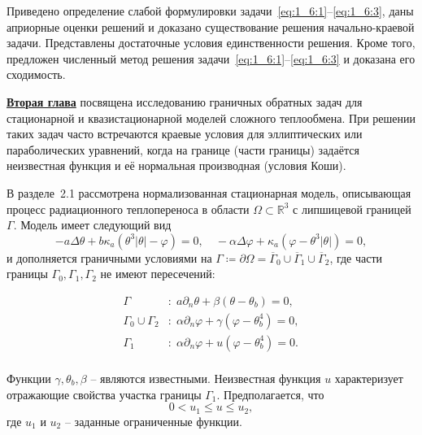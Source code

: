 Приведено определение слабой формулировки задачи~\eqref{eq:1_6:1}--\eqref{eq:1_6:3},
даны априорные оценки решений и доказано существование решения начально-краевой задачи.
Представлены достаточные условия единственности решения.
Кроме того, предложен численный метод решения задачи~\eqref{eq:1_6:1}--\eqref{eq:1_6:3}
и доказана его сходимость.


\underline{\textbf{Вторая глава}} посвящена исследованию граничных обратных задач для
стационарной и квазистационарной моделей сложного теплообмена.
При решении таких задач часто встречаются краевые условия для
эллиптических или параболических уравнений,
когда на границе (части границы) задаётся неизвестная функция
и её нормальная производная (условия Коши).


В разделе~2.1 рассмотрена нормализованная стационарная модель,
описывающая процесс радиационного теплопереноса в
области $\Omega \subset \mathbb{R}^3$ с липшицевой границей $\Gamma$.
Модель имеет следующий вид
\begin{equation}
    \label{eq:2_1:initial}
    - a \Delta \theta + b \kappa_a(\theta ^ 3 | \theta | - \varphi) = 0,  \quad
    - \alpha \Delta \varphi + \kappa_a (\varphi - \theta ^3 | \theta |) = 0,
\end{equation}
и дополняется граничными условиями на
$\Gamma \coloneqq \partial \Omega =\overline{\Gamma}_0 \cup \overline{\Gamma}_1 \cup \overline{\Gamma}_2$,
где части границы $\Gamma_0, \Gamma_1, \Gamma_2$ не имеют пересечений:

\begin{equation}
    \label{eq:2_1:initial-boundary}
    \begin{aligned}
        \Gamma &: \; a \partial_n \theta + \beta (\theta - \theta _b) = 0, \\
        \Gamma_0 \cup \Gamma_2 &: \; \alpha \partial_n \varphi
        + \gamma(\varphi - \theta_b ^4 ) = 0, \\
        \Gamma_1 &: \; \alpha \partial_n \varphi + u(\varphi - \theta_b ^4 ) = 0. \\
    \end{aligned}
\end{equation}


Функции $\gamma, \theta_b, \beta$ -- являются известными.
Неизвестная функция $u$ характеризует отражающие свойства участка границы $\Gamma_1$.
Предполагается, что
\begin{equation}
    \label{eq:2_1:control_bounds}
    0 < u_1 \leq u \leq u_2,
\end{equation}
где $u_1$ и $u_2$ -- заданные ограниченные функции.


